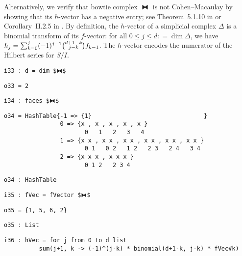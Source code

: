 \documentclass[12pt,leqno]{amsart}
\theoremstyle{definition}
\newcommand{\colequal}{\ensuremath{:\!=}}
\begin{document}
Alternatively, we verify that bowtie complex $⧓$ is not Cohen--Macaulay by
showing that its $h$-vector has a negative entry; see Theorem~5.1.10 in
\cite{BH} or Corollary~II.2.5 in \cite{Stanley}.  By definition, the
$h$-vector of a simplicial complex $\Delta$ is a binomial transform of its
$f\!$-vector: for all $0 \leqslant j \leqslant d \colequal \dim \Delta$, we have
$h_j = \sum_{k=0}^{j} (-1)^{j-1}
\smash{\tbinom{d+1-k}{\raisebox{3pt}{$\scriptstyle j-k$}}} f_{k-1}$.  The
$h$-vector encodes the numerator of the Hilbert series for $S/I$.

\begin{lstlisting}[xleftmargin=10pt, aboveskip=3.0pt, belowskip=1.5pt]
i33 : d = dim $⧓$
\end{lstlisting}
\begin{lstlisting}[xleftmargin=10pt, aboveskip=1.5pt, belowskip=1.5pt]
o33 = 2
\end{lstlisting}
\begin{lstlisting}[xleftmargin=10pt, aboveskip=1.5pt, belowskip=1.5pt]
i34 : faces $⧓$
\end{lstlisting}
\begin{lstlisting}[xleftmargin=10pt, lineskip=-10pt, aboveskip=4pt, belowskip=1pt]
o34 = HashTable{-1 => {1}                                }
                0 => {x , x , x , x , x }
                       0   1   2   3   4
                1 => {x x , x x , x x , x x , x x , x x }
                       0 1   0 2   1 2   2 3   2 4   3 4
                2 => {x x x , x x x }
                       0 1 2   2 3 4
\end{lstlisting}
\begin{lstlisting}[xleftmargin=10pt, aboveskip=1.5pt, belowskip=1.5pt]
o34 : HashTable
\end{lstlisting}
\begin{lstlisting}[xleftmargin=10pt, aboveskip=1.5pt, belowskip=1.5pt]
i35 : fVec = fVector $⧓$
\end{lstlisting}
\begin{lstlisting}[xleftmargin=10pt, aboveskip=1.5pt, belowskip=1.5pt]
o35 = {1, 5, 6, 2}
\end{lstlisting}
\begin{lstlisting}[xleftmargin=10pt, aboveskip=1.5pt, belowskip=1.5pt]
o35 : List
\end{lstlisting}
\begin{lstlisting}[xleftmargin=10pt, lineskip=-10pt, aboveskip=4pt, belowskip=1pt]
i36 : hVec = for j from 0 to d list 
          sum(j+1, k -> (-1)^(j-k) * binomial(d+1-k, j-k) * fVec#k)
\end{lstlisting}
\end{document}
